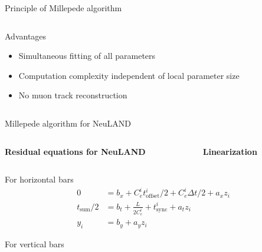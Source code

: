 \documentclass{ikpKoeln}
\newcommand{\espeed}{C^i_e}
\newcommand{\tsync}{t^i_{\text{sync}}}
\newcommand{\toff}{t^i_{\text{offset}}}
\begin{document}
\begin{frame}[t]{Principle of Millepede algorithm}
\begin{columns}[t]
\begin{column}{0.4 \textwidth}
			\begin{exampleblock} {Advantages}
				\small
				\begin{itemize}
					\item Simultaneous fitting of all parameters
					\item Computation complexity independent of local parameter size
					\item No muon track reconstruction
				\end{itemize}
			\end{exampleblock}
		\end{column}
	\end{columns}
\end{frame}

\begin{frame}{Millepede algorithm for NeuLAND}
	\vspace*{-2em}
	\begin{columns}[t]
		\begin{column}{0.45 \textwidth}
			\onslide<1->
			\begin{center}
				\textbf{Residual equations for NeuLAND}
			\end{center}
		\end{column}
		\begin{column}{0.45 \textwidth}
			\onslide<2>
			\begin{center}
				\textbf{Linearization}
			\end{center}
		\end{column}
	\end{columns}
	\begin{columns}[t]
		\begin{column}{0.5 \textwidth}
			\onslide<1->
			\setcounter{equation}{0}
			{\small
				\begin{block}{For horizontal bars}
					\centering
					\vspace*{-1em}
					\begin{align}
						0              & = b_x + \espeed \toff/ 2 + \espeed \Delta t/2 + a_x z_i \\
						t_\text{sum}/2 & =b_t + \frac{L}{2 \espeed}  + \tsync + a_t z_i          \\
						y_i            & = b_y + a_y z_i
					\end{align}
				\end{block}
				\begin{block}{For vertical bars}
					\centering
					\vspace*{-1em}
					\begin{align}

\end{align}
\end{block}}
\end{column}
\end{columns}
\end{frame}
\end{document}

